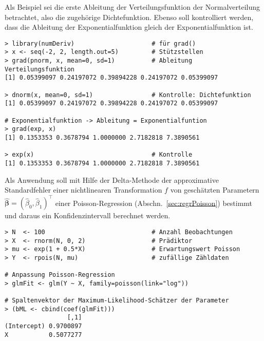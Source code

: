 Als Beispiel sei die erste Ableitung der Verteilungsfunktion der Normalverteilung betrachtet, also die zugehörige Dichtefunktion. Ebenso soll kontrolliert werden, dass die Ableitung der Exponentialfunktion gleich der Exponentialfunktion ist.
\begin{lstlisting}
> library(numDeriv)                     # für grad()
> x <- seq(-2, 2, length.out=5)         # Stützstellen
> grad(pnorm, x, mean=0, sd=1)          # Ableitung Verteilungsfunktion
[1] 0.05399097 0.24197072 0.39894228 0.24197072 0.05399097

> dnorm(x, mean=0, sd=1)                # Kontrolle: Dichtefunktion
[1] 0.05399097 0.24197072 0.39894228 0.24197072 0.05399097

# Exponentialfunktion -> Ableitung = Exponentialfuntion
> grad(exp, x)
[1] 0.1353353 0.3678794 1.0000000 2.7182818 7.3890561

> exp(x)                                # Kontrolle
[1] 0.1353353 0.3678794 1.0000000 2.7182818 7.3890561
\end{lstlisting}

Als Anwendung soll mit Hilfe der Delta-Methode der approximative Standardfehler einer nichtlinearen Transformation $f$ von geschätzten Parametern $\hat{\bm{\beta}} = (\hat{\beta}_{0}, \hat{\beta}_{1})^{\top}$ einer Poisson-Regression (Abschn.\ \ref{sec:regrPoisson}) bestimmt und daraus ein Konfidenzintervall berechnet werden.
\begin{lstlisting}
> N  <- 100                             # Anzahl Beobachtungen
> X  <- rnorm(N, 0, 2)                  # Prädiktor
> mu <- exp(1 + 0.5*X)                  # Erwartungswert Poisson
> Y  <- rpois(N, mu)                    # zufällige Zähldaten

# Anpassung Poisson-Regression
> glmFit <- glm(Y ~ X, family=poisson(link="log"))

# Spaltenvektor der Maximum-Likelihood-Schätzer der Parameter
> (bML <- cbind(coef(glmFit)))
                 [,1]
(Intercept) 0.9700897
X           0.5077277
\end{lstlisting}

